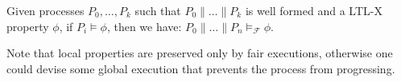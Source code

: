 \begin{theorem}\label{th:prom} Given processes $P_0,\dots, P_k$ such that $P_0 \parallel \dots \parallel P_k$ is well formed and a \textsf{LTL-X} property $\phi$, if $P_i \vDash \phi$, then we have: $P_0 \parallel \dots \parallel P_n \vDash_\mathcal{F} \phi$. 
%
\end{theorem}
%
Note that local properties are preserved only by fair executions, otherwise one could devise some global execution that prevents the process from progressing. 
